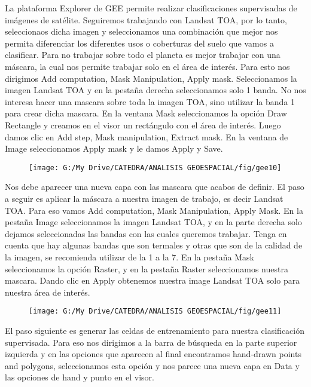 \documentclass[a4paper,oneside,11pt,]{article}
\begin{document}
La plataforma Explorer de GEE permite realizar clasificaciones supervisadas de imágenes de satélite. Seguiremos trabajando con Landsat TOA, por lo tanto, seleccionaos dicha imagen y seleccionamos una combinación que mejor nos permita diferenciar los diferentes usos o coberturas del suelo que vamos a clasificar.
Para no trabajar sobre todo el planeta es mejor trabajar con una máscara, la cual nos permite trabajar solo en el área de interés. Para esto nos dirigimos Add computation, Mask Manipulation, Apply mask. 
Seleccionamos la imagen Landsat TOA y en la pestaña derecha seleccionamos solo 1 banda. No nos interesa hacer una mascara sobre toda la imagen TOA, sino utilizar la banda 1 para crear dicha mascara. En la ventana Mask seleccionamos la opción Draw Rectangle y creamos en el visor un rectángulo con el área de interés.
Luego damos clic en Add step, Mask manipulation, Extract mask. En la ventana de Image seleccionamos Apply mask y le damos Apply y Save.

\begin{figure}
\centering
\texttt{[image: G:/My Drive/CATEDRA/ANALISIS GEOESPACIAL/fig/gee10]}
\end{figure}

Nos debe aparecer una nueva capa con las mascara que acabos de definir. El paso a seguir es aplicar la máscara a nuestra imagen de trabajo, es decir Landsat TOA. Para eso vamos Add computation, Mask Manipulation, Apply Mask. En la pestaña Image seleccionamos la imagen Landsat TOA, y en la parte derecha solo dejamos seleccionadas las bandas con las cuales queremos trabajar. Tenga en cuenta que hay algunas bandas que son termales y otras que son de la calidad de la imagen, se recomienda utilizar de la 1 a la 7. En la pestaña Mask seleccionamos la opción Raster, y en la pestaña Raster seleccionamos nuestra mascara. Dando clic en Apply obtenemos nuestra image Landsat TOA solo para nuestra área de interés.

\begin{figure}
\centering
\texttt{[image: G:/My Drive/CATEDRA/ANALISIS GEOESPACIAL/fig/gee11]}
\end{figure}

El paso siguiente es generar las celdas de entrenamiento para nuestra clasificación supervisada. Para eso nos dirigimos a la barra de búsqueda en la parte superior izquierda y en las opciones que aparecen al final encontramos hand-drawn points and polygons, seleccionamos esta opción y nos parece una nueva capa en Data y las opciones de hand y punto en el visor. 
\end{document}
